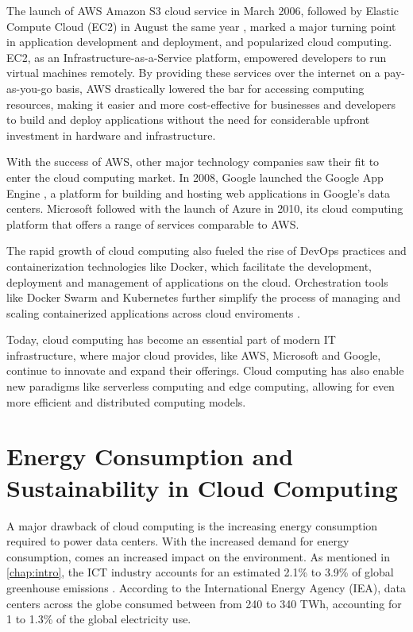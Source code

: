 \documentclass[
  table]{report}
\begin{document}
The launch of \ac{AWS} Amazon S3 cloud service in March 2006, followed
by Elastic Compute Cloud (EC2) in August the same year
\citep{barrAmazonEC2Beta2006}, marked a major turning point in
application development and deployment, and popularized cloud computing.
EC2, as an Infrastructure-as-a-Service platform, empowered developers to
run virtual machines remotely. By providing these services over the
internet on a pay-as-you-go basis, \ac{AWS} drastically lowered the bar
for accessing computing resources, making it easier and more
cost-effective for businesses and developers to build and deploy
applications without the need for considerable upfront investment in
hardware and infrastructure.

With the success of \ac{AWS}, other major technology companies saw their
fit to enter the cloud computing market. In 2008, Google launched the
Google App Engine \citep{mcdonaldIntroducingGoogleApp2008}, a platform
for building and hosting web applications in Google's data centers.
Microsoft followed with the launch of Azure in 2010, its cloud computing
platform that offers a range of services comparable to \ac{AWS}.

The rapid growth of cloud computing also fueled the rise of DevOps
practices and containerization technologies like Docker, which
facilitate the development, deployment and management of applications on
the cloud. Orchestration tools like Docker Swarm and Kubernetes further
simplify the process of managing and scaling containerized applications
across cloud enviroments \citep{bernsteinContainersCloudLXC2014}.

Today, cloud computing has become an essential part of modern IT
infrastructure, where major cloud provides, like \ac{AWS}, Microsoft and
Google, continue to innovate and expand their offerings. Cloud computing
has also enable new paradigms like serverless computing and edge
computing, allowing for even more efficient and distributed computing
models. \citep{baldiniServerlessComputingCurrent2017}

\section{Energy Consumption and Sustainability in Cloud Computing}

A major drawback of cloud computing is the increasing energy consumption
required to power data centers. With the increased demand for energy
consumption, comes an increased impact on the environment. As mentioned
in \cref{chap:intro}, the ICT industry accounts for an estimated 2.1\%
to 3.9\% of global greenhouse emissions \citep{freitag2021}. According
to the International Energy Agency (IEA), data centers across the globe
consumed between from 240 to 340 TWh, accounting for 1 to 1.3\% of the
global electricity use.
\end{document}
